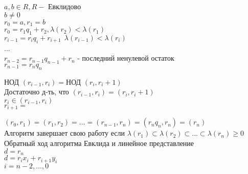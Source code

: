 $ a, b \in R, R - $ Евклидово \\
$ b \neq 0 $ \\
$ r_0 = a, r_1 = b $ \\
$ r_0 = r_1q_1 + r_2, \lambda(r_2) < \lambda(r_1) $ \\
$ r_{i-1} = r_i q_i + r_{i+1} \ \ \lambda (r_{i-1}) <  \lambda(r_i) $\\
...\\
$ r_{n-2} = r_{n-1} q_{n-1} + r_n $ - последний ненулевой остаток \\
$ r_{n-1} = r_nq_n $\\
\begin{lemma}
	НОД $ (r_{i-1}, r_i) = $НОД $( r_i, r_i+1) $ \\
	Достаточно д-ть, что $ (r_{i-1}, r_i) = ( r_i, r_i+1) $ \\
	$ r_i \in (r_{i-1}, r_i) $\\
	$ r_{i+1} = $ %
\end{lemma}
$ (r_0, r_1) = (r_1, r_2) = ... = (r_{n-1}, r_n) = (r_nq_n, r_n) = (r_n) $\\
Алгоритм завершает свою работу если $ \lambda (r_1) \subset \lambda (r_2) \subset ... \subset \lambda (r_n) \geq 0 $ \\
Обратный ход алгоритма Евклида и линейное представление  \\
$ d = r_n $ \\
$ d = r_ix_i+r_{i+1}y_i $ \\
$ i = n-2, ..., 0 $ \\














